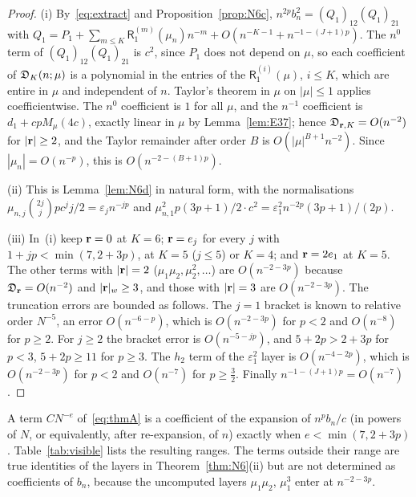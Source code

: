 \begin{proof}
(i) By~\eqref{eq:extract} and Proposition~\ref{prop:N6c}, $n^{2p}b_n^2=(Q_1)_{12}(Q_1)_{21}$ with
$Q_1=P_1+\sum_{m\le K}\mathsf R_1^{(m)}(\mu_n)n^{-m}+O(n^{-K-1}+n^{-1-(J+1)p})$. The $n^0$ term of $(Q_1)_{12}(Q_1)_{21}$ is
$c^2$, since $P_1$ does not depend on $\mu$, so each coefficient of $\mathfrak D_K(n;\mu)$ is a polynomial in the entries of the
$\mathsf R_1^{(i)}(\mu)$, $i\le K$, which are entire in $\mu$ and independent of $n$. Taylor's theorem in $\mu$ on $|\mu|\le1$
applies coefficientwise. The $n^0$ coefficient is $1$ for all $\mu$, and the $n^{-1}$ coefficient is $d_1+cpM_\mu(4c)$,
exactly linear in $\mu$ by Lemma~\ref{lem:E37}; hence $\mathfrak D_{\mathbf r,K}=O(n^{-2})$ for $|\mathbf r|\ge2$, and the Taylor remainder
after order $B$ is $O(|\mu|^{B+1}n^{-2})$. Since $|\mu_n|=O(n^{-p})$, this is $O(n^{-2-(B+1)p})$.

(ii) This is Lemma~\ref{lem:N6d} in natural form, with the normalisations
$\mu_{n,j}\binom{2j}jpc^jj/2=\varepsilon_jn^{-jp}$ and $\mu_{n,1}^2p(3p+1)/2\cdot c^2=\varepsilon_1^2n^{-2p}(3p+1)/(2p)$.

(iii) In~(i) keep $\mathbf r=0$ at $K=6$; $\mathbf r=e_j$ for every $j$ with $1+jp<\min(7,2+3p)$, at $K=5$ ($j\le5$) or $K=4$; and
$\mathbf r=2e_1$ at $K=5$. The other terms with $|\mathbf r|=2$ ($\mu_1\mu_2,\mu_2^2,\dots$) are $O(n^{-2-3p})$ because
$\mathfrak D_\mathbf r=O(n^{-2})$ and $|\mathbf r|_w\ge3$, and those with $|\mathbf r|=3$ are $O(n^{-2-3p})$. The truncation errors are bounded as
follows. The $j=1$ bracket is known to relative order $N^{-5}$, an error $O(n^{-6-p})$, which is $O(n^{-2-3p})$ for $p<2$
and $O(n^{-8})$ for $p\ge2$. For $j\ge2$ the bracket error is $O(n^{-5-jp})$, and $5+2p>2+3p$ for $p<3$, $5+2p\ge11$ for
$p\ge3$. The $h_2$ term of the $\varepsilon_1^2$ layer is $O(n^{-4-2p})$, which is $O(n^{-2-3p})$ for $p<2$ and $O(n^{-7})$ for
$p\ge\frac32$. Finally $n^{-1-(J+1)p}=O(n^{-7})$.
\end{proof}

A term $CN^{-e}$ of~\eqref{eq:thmA} is a coefficient of the expansion of $n^pb_n/c$ (in powers of $N$, or equivalently,
after re-expansion, of $n$) exactly when $e<\min(7,2+3p)$. Table~\ref{tab:visible} lists the resulting ranges. The terms
outside their range are true identities of the layers in Theorem~\ref{thm:N6}(ii) but are not determined as coefficients
of $b_n$, because the uncomputed layers $\mu_1\mu_2$, $\mu_1^3$ enter at $n^{-2-3p}$.

